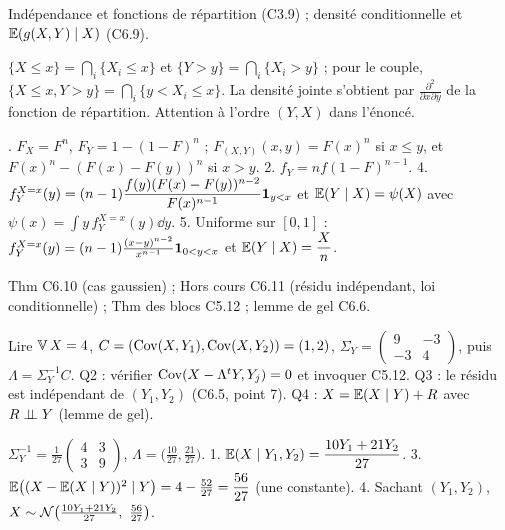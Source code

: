 \documentclass[11pt,a4paper]{article}
\begin{document}
\begin{exo}
\outils Indépendance et fonctions de répartition (C3.9) ; densité conditionnelle et $\mathbb{E}(g(X,Y)\mid X)$ (C6.9).

\meth $\{X\le x\}=\bigcap_i\{X_i\le x\}$ et $\{Y>y\}=\bigcap_i\{X_i>y\}$ ; pour le couple, $\{X\le x,Y>y\}=\bigcap_i\{y<X_i\le x\}$.
La densité jointe s'obtient par $\frac{\partial^2}{\partial x\partial y}$ de la fonction de répartition. Attention à l'ordre $(Y,X)$ dans l'énoncé.

. $F_X=F^n$, $F_Y=1-(1-F)^n$ ; $F_{(X,Y)}(x,y)=F(x)^n$ si $x\le y$, et $F(x)^n-(F(x)-F(y))^n$ si $x>y$.
2. $f_Y=nf(1-F)^{n-1}$.
4. $f_Y^{X=x}(y)=(n-1)\dfrac{f(y)(F(x)-F(y))^{n-2}}{F(x)^{n-1}}\mathbf{1}_{y<x}$ et $\mathbb{E}(Y\mid X)=\psi(X)$ avec $\psi(x)=\int y\,f_Y^{X=x}(y)\dd y$.
5. Uniforme sur $[0,1]$ : $f_Y^{X=x}(y)=(n-1)\frac{(x-y)^{n-2}}{x^{n-1}}\mathbf{1}_{0<y<x}$ et $\mathbb{E}(Y\mid X)=\dfrac Xn$.
\end{exo}

\begin{exo}
\outils Thm C6.10 (cas gaussien) ; Hors cours C6.11 (résidu indépendant, loi conditionnelle) ; Thm des blocs C5.12 ; lemme de gel C6.6.

\meth Lire $\operatorname{\mathbb{V}} X=4$, $C=(\operatorname{Cov}(X,Y_1),\operatorname{Cov}(X,Y_2))=(1,2)$, $\Sigma_Y=\begin{pmatrix}9&-3\\-3&4\end{pmatrix}$, puis $\Lambda=\Sigma_Y^{-1}C$.
Q2 : vérifier $\operatorname{Cov}(X-\Lambda^tY,Y_j)=0$ et invoquer C5.12. Q3 : le résidu est indépendant de $(Y_1,Y_2)$ (C6.5, point 7).
Q4 : $X=\mathbb{E}(X\mid Y)+R$ avec $R\perp\!\!\!\perp Y$ (lemme de gel).

\rep $\Sigma_Y^{-1}=\frac1{27}\begin{pmatrix}4&3\\3&9\end{pmatrix}$, $\Lambda=\bigl(\frac{10}{27},\frac{21}{27}\bigr)$.
1. $\mathbb{E}(X\mid Y_1,Y_2)=\dfrac{10Y_1+21Y_2}{27}$.
3. $\mathbb{E}\bigl((X-\mathbb{E}(X\mid Y))^2\mid Y\bigr)=4-\frac{52}{27}=\dfrac{56}{27}$ (une constante).
4. Sachant $(Y_1,Y_2)$, $X\sim\Nc\bigl(\frac{10Y_1+21Y_2}{27},\ \frac{56}{27}\bigr)$.
\end{exo}
\end{document}

